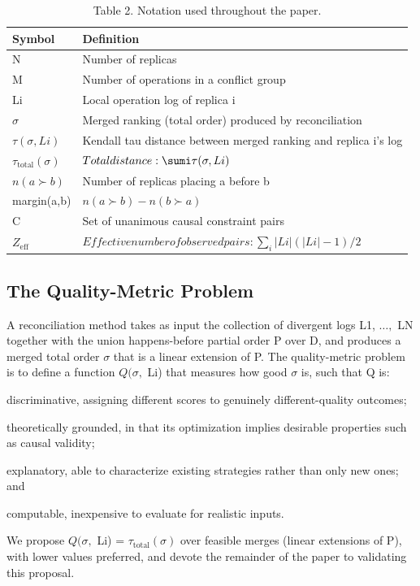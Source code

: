 \documentclass[journal]{IEEEtran}
\begin{document}
\begin{table}[t]
\centering
\caption{Table 2. Notation used throughout the paper.}
\begin{tabular}{ll}
\hline
Symbol & Definition \\
\hline
N & Number of replicas \\
M & Number of operations in a conflict group \\
Li & Local operation log of replica i \\
$\sigma$ & Merged ranking (total order) produced by reconciliation \\
$\tau(\sigma, Li)$ & Kendall tau distance between merged ranking and replica i's log \\
$\tau_{\mathrm{total}}(\sigma)$ & $Total distance: \sumi \tau(\sigma, Li)$ \\
$n(a \succ b)$ & Number of replicas placing a before b \\
margin(a,b) & $n(a \succ b) - n(b \succ a)$ \\
C & Set of unanimous causal constraint pairs \\
$Z_{\mathrm{eff}}$ & $Effective number of observed pairs: \sum_{i} |Li|(|Li|-1)/2$ \\
\hline
\end{tabular}
\end{table}

\subsection{The Quality-Metric Problem}
A reconciliation method takes as input the collection of divergent logs {L1, $\ldots,$ LN} together with the union happens-before partial order P over D, and produces a merged total order $\sigma$ that is a linear extension of P. The quality-metric problem is to define a function $Q(\sigma,$ {Li}) that measures how good $\sigma$ is, such that Q is:

discriminative, assigning different scores to genuinely different-quality outcomes;

theoretically grounded, in that its optimization implies desirable properties such as causal validity;

explanatory, able to characterize existing strategies rather than only new ones; and

computable, inexpensive to evaluate for realistic inputs.

We propose $Q(\sigma,$ {Li}) = $\tau_{\mathrm{total}}(\sigma)$ over feasible merges (linear extensions of P), with lower values preferred, and devote the remainder of the paper to validating this proposal.
\end{document}
